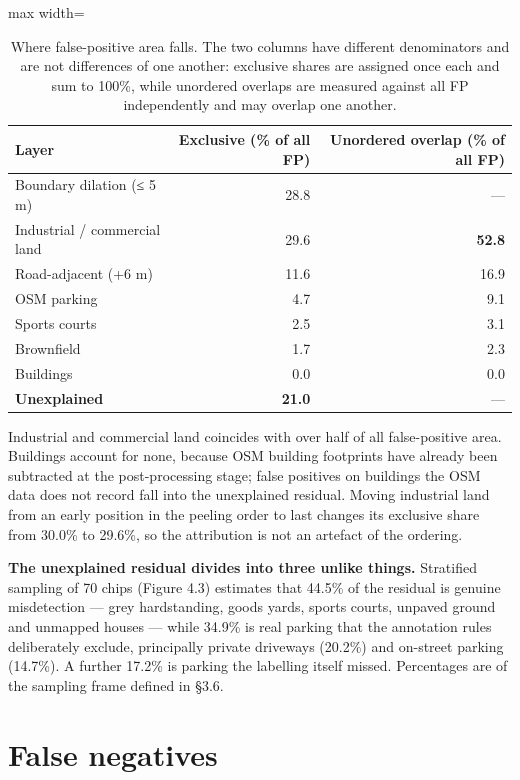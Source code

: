 \begin{table}[htbp]
\centering
\caption{Where false-positive area falls. The two columns have different denominators and are not differences of one another: exclusive shares are assigned once each and sum to 100\%, while unordered overlaps are measured against all FP independently and may overlap one another.}\label{tab:4.2}
\begin{adjustbox}{max width=\textwidth}
\begin{tabular}{@{}lrr@{}}
\toprule
Layer & Exclusive (\% of all FP) & Unordered overlap (\% of all FP) \\
\midrule
Boundary dilation (≤ 5 m) & 28.8 & --- \\
Industrial / commercial land & 29.6 & \textbf{52.8} \\
Road-adjacent (+6 m) & 11.6 & 16.9 \\
OSM parking & 4.7 & 9.1 \\
Sports courts & 2.5 & 3.1 \\
Brownfield & 1.7 & 2.3 \\
Buildings & 0.0 & 0.0 \\
\textbf{Unexplained} & \textbf{21.0} & --- \\
\bottomrule
\end{tabular}
\end{adjustbox}
\end{table}
\restoreparskip

Industrial and commercial land coincides with over half of all false-positive area. Buildings account for none, because OSM building footprints have already been subtracted at the post-processing stage; false positives on buildings the OSM data does not record fall into the unexplained residual. Moving industrial land from an early position in the peeling order to last changes its exclusive share from 30.0\% to 29.6\%, so the attribution is not an artefact of the ordering.

\textbf{The unexplained residual divides into three unlike things.} Stratified sampling of 70 chips (Figure 4.3) estimates that 44.5\% of the residual is genuine misdetection --- grey hardstanding, goods yards, sports courts, unpaved ground and unmapped houses --- while 34.9\% is real parking that the annotation rules deliberately exclude, principally private driveways (20.2\%) and on-street parking (14.7\%). A further 17.2\% is parking the labelling itself missed. Percentages are of the sampling frame defined in §3.6.

\hypertarget{false-negatives}{%
\section{False negatives}\label{false-negatives}}

